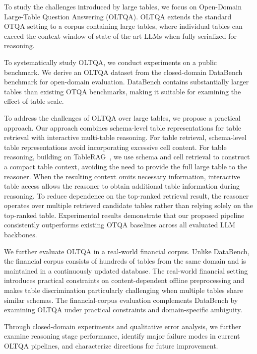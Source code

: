 To study the challenges introduced by large tables, we focus on Open-Domain Large-Table Question Answering (OLTQA).
OLTQA extends the standard OTQA setting to a corpus containing large tables, where individual tables can exceed the context window of state-of-the-art LLMs when fully serialized for reasoning.

To systematically study OLTQA, we conduct experiments on a public benchmark.
We derive an OLTQA dataset from the closed-domain DataBench benchmark for open-domain evaluation.
DataBench contains substantially larger tables than existing OTQA benchmarks, making it suitable for examining the effect of table scale.


To address the challenges of OLTQA over large tables, we propose a practical approach.
Our approach combines schema-level table representations for table retrieval with interactive multi-table reasoning.
For table retrieval, schema-level table representations avoid incorporating excessive cell content.
For table reasoning, building on TableRAG~\cite{tablerag}, we use schema and cell retrieval to construct a compact table context, avoiding the need to provide the full large table to the reasoner.
When the resulting context omits necessary information, interactive table access allows the reasoner to obtain additional table information during reasoning.
To reduce dependence on the top-ranked retrieval result, the reasoner operates over multiple retrieved candidate tables rather than relying solely on the top-ranked table.
Experimental results demonstrate that our proposed pipeline consistently outperforms existing OTQA baselines across all evaluated LLM backbones.

We further evaluate OLTQA in a real-world financial corpus.
Unlike DataBench, the financial corpus consists of hundreds of tables from the same domain and is maintained in a continuously updated database. The real-world financial setting introduces practical constraints on content-dependent offline preprocessing and makes table discrimination particularly challenging when multiple tables share similar schemas.
The financial-corpus evaluation complements DataBench by examining OLTQA under practical constraints and domain-specific ambiguity.

Through closed-domain experiments and qualitative error analysis, we further examine reasoning stage performance, identify major failure modes in current OLTQA pipelines, and characterize directions for future improvement.

